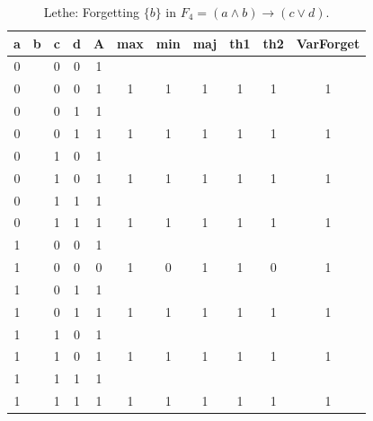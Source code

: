 \begin{table}[!tb]
    \centering
    \begin{tabular}{|c|c|c|c|c|c|c|c|c|c|c|}
        \hline
        \textbf{a} & \textbf{b} & \textbf{c} & \textbf{d} & \textbf{A} & \textbf{max} & \textbf{min} & \textbf{maj} & \textbf{th1} & \textbf{th2} & \textbf{VarForget} \\ \hline
        \rowcolor{gray!40} 0 &  & 0 & 0 & 1 &  &  &  &  &  &  \\ \hline
        \rowcolor{gray!40} 0 &  & 0 & 0 & 1 & 1 & 1 & 1 & 1 & 1 & 1 \\ \hline
        \rowcolor{blue!40} 0 &  & 0 & 1 & 1 &  &  &  &  &  &  \\ \hline
        \rowcolor{blue!40} 0 &  & 0 & 1 & 1 & 1 & 1 & 1 & 1 & 1 & 1 \\ \hline
        \rowcolor{red!40} 0 &  & 1 & 0 & 1 &  &  &  &  &  &  \\ \hline
        \rowcolor{red!40} 0 &  & 1 & 0 & 1 & 1 & 1 & 1 & 1 & 1 & 1 \\ \hline
        \rowcolor{green!40} 0 &  & 1 & 1 & 1 &  &  &  &  &  &  \\ \hline
        \rowcolor{green!40} 0 &  & 1 & 1 & 1 & 1 & 1 & 1 & 1 & 1 & 1 \\ \hline
        \rowcolor{yellow!40} 1 &  & 0 & 0 & 1 &  &  &  &  &  &  \\ \hline
        \rowcolor{yellow!40} 1 &  & 0 & 0 & 0 & 1 & 0 & 1 & 1 & 0 & 1 \\ \hline
        \rowcolor{gray!40} 1 &  & 0 & 1 & 1 &  &  &  &  &  &  \\ \hline
        \rowcolor{gray!40} 1 &  & 0 & 1 & 1 & 1 & 1 & 1 & 1 & 1 & 1 \\ \hline
        \rowcolor{blue!40} 1 &  & 1 & 0 & 1 &  &  &  &  &  &  \\ \hline
        \rowcolor{blue!40} 1 &  & 1 & 0 & 1 & 1 & 1 & 1 & 1 & 1 & 1 \\ \hline
        \rowcolor{red!40} 1 &  & 1 & 1 & 1 &  &  &  &  &  &  \\ \hline
        \rowcolor{red!40} 1 &  & 1 & 1 & 1 & 1 & 1 & 1 & 1 & 1 & 1 \\ \hline
    \end{tabular}
    \caption{Lethe: Forgetting $\{b\}$ in $F_{4} = (a \land b) \rightarrow (c \lor d)$.}
    \label{tab:lethe-F4-b}
\end{table}
